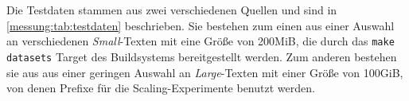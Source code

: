 
Die Testdaten stammen aus zwei verschiedenen Quellen und sind in \cref{messung:tab:testdaten} beschrieben. Sie bestehen zum einen aus einer Auswahl an verschiedenen \textit{Small}-Texten mit eine Größe von 200MiB, die durch das \texttt{make datasets} Target des Buildsystems bereitgestellt werden. Zum anderen bestehen sie aus aus einer geringen Auswahl an \textit{Large}-Texten mit einer Größe von 100GiB, von denen Prefixe für die Scaling-Experimente benutzt werden.


